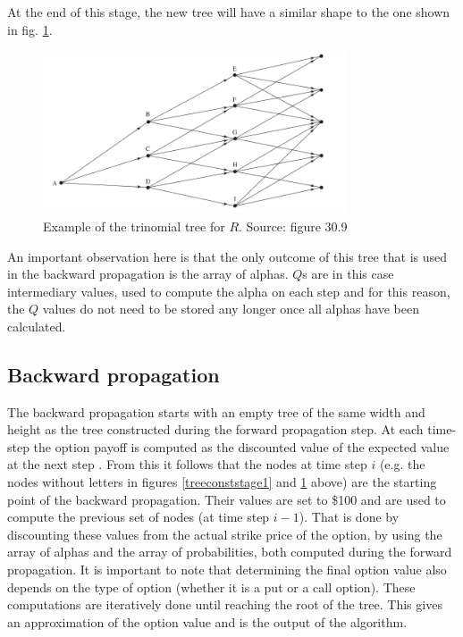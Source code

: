 At the end of this stage, the new tree will have a similar shape to the one shown in fig. \ref{treeconststage2}. 
\begin{figure}[H]
	\centering
	\includegraphics[width=0.8\textwidth]{img/treeconststage2.png}
	\caption{Example of the trinomial tree for $R$. Source: figure 30.9 \cite[pg. 702]{ofod}}
	\label{treeconststage2}
\end{figure}
An important observation here is that the only outcome of this tree that is used in the backward propagation is the array of alphas. $Q$s are in this case intermediary values, used to compute the alpha on each step and for this reason, the $Q$ values do not need to be stored any longer once all alphas have been calculated. 
\subsection{Backward propagation}
The backward propagation starts with an empty tree of the same width and height as the tree constructed during the forward propagation step. At each time-step the option payoff is computed as the discounted value of the expected value at the next step \cite[pg. 6]{uhwirt}. From this it follows that the nodes at time step $i$ (e.g. the nodes without letters in figures \ref{treeconststage1} and \ref{treeconststage2} above) are the starting point of the backward propagation. Their values are set to \$100 and are used to compute the previous set of nodes (at time step $i-1$). That is done by discounting these values from the actual strike price of the option, by using the array of alphas and the array of probabilities, both computed during the forward propagation. It is important to note that determining the final option value also depends on the type of option (whether it is a put or a call option). These computations are iteratively done until reaching the root of the tree. This gives an approximation of the option value and is the output of the algorithm. 
